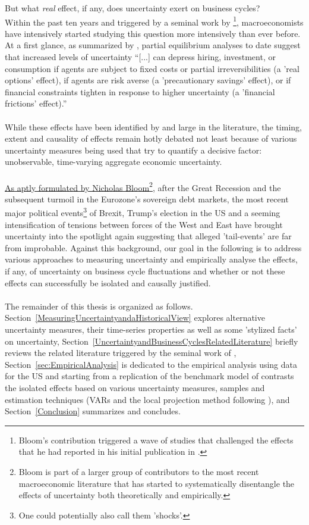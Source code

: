 \documentclass[a4paper,12pt,oneside,pointednumbers,bibtotoc,bigheadings,liststotoc]{scrbook}
\begin{document}
But what \textit{real} effect, if any, does uncertainty exert on business cycles? \\
Within the past ten years and triggered by a seminal work by \citet{bloom:09}\footnote{Bloom's contribution triggered a wave of studies that challenged the effects that he had reported in his initial publication in \citet{bloom:09}.}, macroeconomists have intensively started studying this question more intensively than ever before. At a first glance, as summarized by \citet[p. 1177]{juradoetal:15}, partial equilibrium analyses to date suggest that increased levels of uncertainty ``[...] can depress hiring, investment, or consumption if agents are subject to fixed costs or partial irreversibilities (a 'real options' effect), if agents are risk averse (a 'precautionary savings' effect), or if financial constraints tighten in response to higher uncertainty (a 'financial frictions' effect).'' \\
\\
While these effects have been identified by and large in the literature, the timing, extent and causality of effects remain hotly debated not least because of various uncertainty measures being used that try to quantify a decisive factor: unobservable, time-varying aggregate economic uncertainty.\\
\\
\href{https://site.stanford.edu/2018/session-6}{As aptly formulated by Nicholas Bloom}\footnote{Bloom is part of a larger group of contributors to the most recent macroeconomic literature that has started to systematically disentangle the effects of uncertainty both theoretically and empirically.}, after the Great Recession and the subsequent turmoil in the Eurozone's sovereign debt markets, the most recent major political events\footnote{One could potentially also call them 'shocks'.} of Brexit, Trump's election in the US and a seeming intensification of tensions between forces of the West and East have brought uncertainty into the spotlight again suggesting that alleged 'tail-events' are far from improbable. Against this background, our goal in the following is to address various approaches to measuring uncertainty and empirically analyse the effects, if any, of uncertainty on business cycle fluctuations and whether or not these effects can successfully be isolated and causally justified.
\\
\\
The remainder of this thesis is organized as follows. Section~\ref{MeasuringUncertaintyandaHistoricalView} explores alternative uncertainty measures, their time-series properties as well as some 'stylized facts' on uncertainty, Section~\ref{UncertaintyandBusinessCyclesRelatedLiterature} briefly reviews the related literature triggered by the seminal work of \citet{bloom:09}, Section~\ref{sec:EmpiricalAnalysis} is dedicated to the empirical analysis using data for the US and starting from a replication of the benchmark model of \citet{bloom:09} contrasts the isolated effects based on various uncertainty measures, samples and estimation techniques (VARs and the local projection method following \citealp{jorda:05}), and Section~\ref{Conclusion} summarizes and concludes. \\
\end{document}
